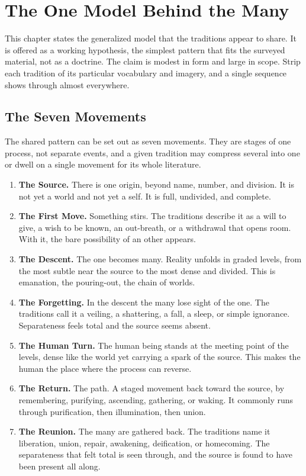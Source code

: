 \chapter{The One Model Behind the Many}

This chapter states the generalized model that the traditions appear to share. It is offered as a working
hypothesis, the simplest pattern that fits the surveyed material, not as a doctrine. The claim is modest in
form and large in scope. Strip each tradition of its particular vocabulary and imagery, and a single
sequence shows through almost everywhere.

\section{The Seven Movements}

The shared pattern can be set out as seven movements. They are stages of one process, not separate events,
and a given tradition may compress several into one or dwell on a single movement for its whole literature.

\begin{enumerate}
  \item \textbf{The Source.} There is one origin, beyond name, number, and division. It is not yet a world
  and not yet a self. It is full, undivided, and complete.
  \item \textbf{The First Move.} Something stirs. The traditions describe it as a will to give, a wish to be
  known, an out-breath, or a withdrawal that opens room. With it, the bare possibility of an other appears.
  \item \textbf{The Descent.} The one becomes many. Reality unfolds in graded levels, from the most subtle
  near the source to the most dense and divided. This is emanation, the pouring-out, the chain of worlds.
  \item \textbf{The Forgetting.} In the descent the many lose sight of the one. The traditions call it a
  veiling, a shattering, a fall, a sleep, or simple ignorance. Separateness feels total and the source seems
  absent.
  \item \textbf{The Human Turn.} The human being stands at the meeting point of the levels, dense like the
  world yet carrying a spark of the source. This makes the human the place where the process can reverse.
  \item \textbf{The Return.} The path. A staged movement back toward the source, by remembering, purifying,
  ascending, gathering, or waking. It commonly runs through purification, then illumination, then union.
  \item \textbf{The Reunion.} The many are gathered back. The traditions name it liberation, union, repair,
  awakening, deification, or homecoming. The separateness that felt total is seen through, and the source is
  found to have been present all along.
\end{enumerate}

